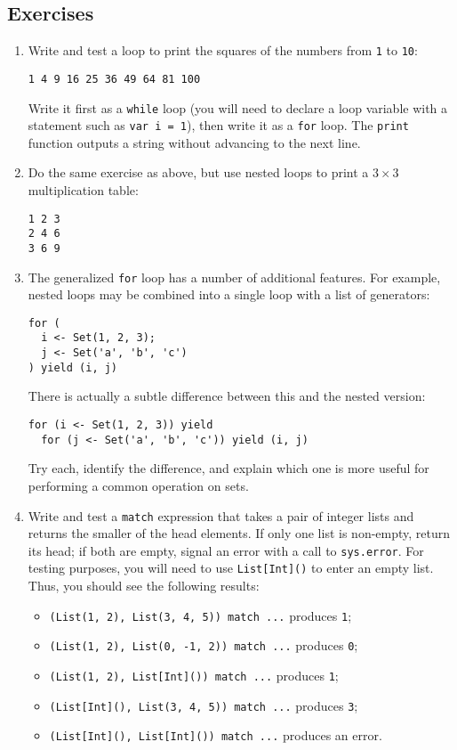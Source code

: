 \documentclass[11pt]{article}
\begin{document}
\subsection*{Exercises}
\begin{enumerate}
\item Write and test a loop to print the squares of the numbers from \texttt{1} to \texttt{10}:
\begin{center}
\texttt{1 4 9 16 25 36 49 64 81 100}
\end{center}
Write it first as a \texttt{while} loop (you will need to declare a loop variable with a statement such as \verb|var i = 1|), then write it as a \texttt{for} loop. The \texttt{print} function outputs a string without advancing to the next line.

\item Do the same exercise as above, but use nested loops to print a $3\times 3$ multiplication table:
\begin{center}
\texttt{1 2 3}\\
\texttt{2 4 6}\\
\texttt{3 6 9}
\end{center}

\item The generalized \texttt{for} loop has a number of additional features. For example, nested loops may be combined into a single loop with a list of generators:
\begin{verbatim}
for (
  i <- Set(1, 2, 3);
  j <- Set('a', 'b', 'c')
) yield (i, j)
\end{verbatim}
There is actually a subtle difference between this and the nested version:
\begin{verbatim}
for (i <- Set(1, 2, 3)) yield
  for (j <- Set('a', 'b', 'c')) yield (i, j)
\end{verbatim}
Try each, identify the difference, and explain which one is more useful for performing a common operation on sets.

\item Write and test a \texttt{match} expression that takes a pair of integer lists and returns the smaller of the head elements. If only one list is non-empty, return its head; if both are empty, signal an error with a call to \texttt{sys.error}. For testing purposes, you will need to use \verb|List[Int]()| to enter an empty list. Thus, you should see the following results:
\begin{itemize}
\item \verb|(List(1, 2), List(3, 4, 5)) match ...| produces \texttt{1};
\item \verb|(List(1, 2), List(0, -1, 2)) match ...| produces \texttt{0};
\item \verb|(List(1, 2), List[Int]()) match ...| produces \texttt{1};
\item \verb|(List[Int](), List(3, 4, 5)) match ...| produces \texttt{3};
\item \verb|(List[Int](), List[Int]()) match ...| produces an error.
\end{itemize} 
\end{enumerate}
\end{document}
